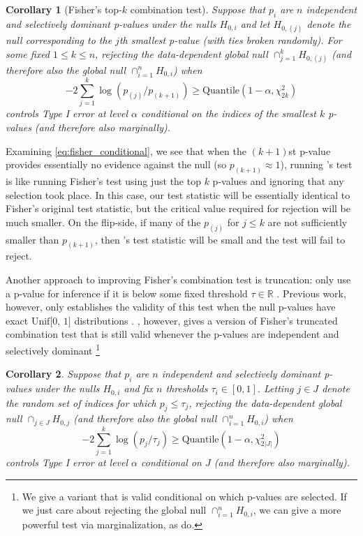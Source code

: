 \documentclass{article}
\newtheorem{corollary}{Corollary}
\newcommand{\R}{\mathbb{R}}
\begin{document}
\begin{corollary}[Fisher's top-$k$ combination test]
    \label{cor:cfisher}
    Suppose that $p_i$ are $n$ independent and selectively dominant p-values under the nulls $H_{0, i}$ and let $H_{0, (j)}$ denote the null corresponding to the $j$th smallest p-value (with ties broken randomly). For some fixed $1 \leq k \leq n$,  rejecting the data-dependent global null $\cap_{j=1}^k H_{0, (j)}$ (and therefore also the global null $\cap_{i=1}^n H_{0, i}$) when 
    \begin{equation}
        \label{eq:fisher_conditional}
        -2 \sum_{j=1}^k \log(p_{(j)}/p_{(k+1)}) \geq \text{Quantile}(1-\alpha, \chi^2_{2k})
    \end{equation}
    controls Type I error at level $\alpha$ conditional on the indices of the smallest $k$ p-values (and therefore also marginally). 
\end{corollary}

Examining \eqref{eq:fisher_conditional}, we see that when the $(k+1)$st p-value provides essentially no evidence against the null (so $p_{(k+1)} \approx 1$), running 's test is like running Fisher's test using just the top $k$ p-values and ignoring that any selection took place. In this case, our test statistic will be essentially identical to Fisher's original test statistic, but the critical value required for rejection will be much smaller. On the flip-side, if many of the $p_{(j)}$ for $j \leq k$ are not sufficiently smaller than $p_{(k+1)}$, then 's test statistic will be small and the test will fail to reject.

Another approach to improving Fisher's combination test is truncation: only use a p-value for inference if it is below some fixed threshold $\tau \in \R$ \citep{Zaykin}. Previous work, however, only establishes the validity of this test when the null p-values have exact $\text{Unif[0, 1]}$ distributions \citep{Zaykin, Zhang}. , however, gives a version of Fisher's truncated combination test that is still valid whenever the p-values are independent and selectively dominant \footnote{We give a variant that is valid conditional on which p-values are selected. If we just care about rejecting the global null $\cap_{i=1}^n H_{0, i}$, we can give a more powerful test via marginalization, as \cite{Zaykin} do.}

\begin{corollary}
    \label{cor:tfisher}
    Suppose that $p_i$ are $n$ independent and selectively dominant p-values under the nulls $H_{0, i}$ and fix $n$ thresholds $\tau_i \in [0, 1]$. Letting $j \in J$ denote the random set of indices for which $p_j \leq \tau_j$, rejecting the data-dependent global null $\cap_{j \in J} H_{0, j}$ (and therefore also the global null $\cap_{i=1}^n H_{0, i}$) when 
    \begin{equation*}
        -2 \sum_{j=1}^k \log(p_j/\tau_j) \geq \text{Quantile}(1-\alpha, \chi^2_{2|J|})
    \end{equation*} 
    controls Type I error at level $\alpha$ conditional on $J$ (and therefore also marginally). 
\end{corollary}
\end{document}
